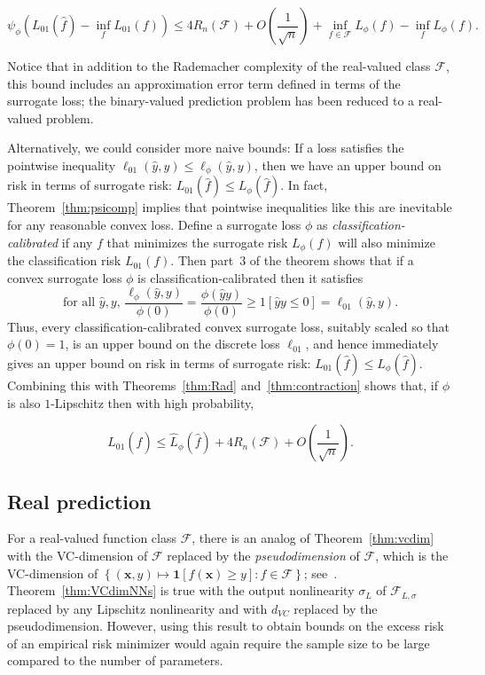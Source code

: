 \begin{equation}\label{eqn:phiriskbound}
  \psi_\phi\left(L_{01}(\widehat f)-\inf_fL_{01}(f)\right)
  \le 4R_n({\mathcal F}) + O\left(\frac{1}{\sqrt n}\right) +
  \inf_{f\in{\mathcal F}}L_{\phi}(f)-\inf_fL_{\phi}(f).
\end{equation}

Notice that in addition to the Rademacher complexity of the real-valued class ${\mathcal F}$, this bound includes an approximation error term defined in terms of the surrogate loss; the binary-valued prediction problem has been reduced to a real-valued problem.

Alternatively, we could consider more naive bounds: If a loss satisfies the pointwise inequality $\ell_{01}(\widehat
y,y)\le\ell_{\phi}(\widehat y,y)$, then we have an upper bound on risk in terms of surrogate risk: $L_{01}(\widehat f)\le L_{\phi}(\widehat f)$.  In fact,
Theorem~\ref{thm:psicomp} implies that pointwise inequalities like this are inevitable for any reasonable convex loss. Define a surrogate loss $\phi$ as {\em classification-calibrated} if any $f$ that minimizes the surrogate risk $L_\phi(f)$ will also minimize the classification risk $L_{01}(f)$.  Then part~3 of the theorem shows that if a convex surrogate loss $\phi$ is classification-calibrated then it satisfies
  \[
    \text{for all $\widehat y, y$, } \frac{\ell_\phi(\widehat y,y)}{\phi(0)}
    = \frac{\phi(\widehat y y)}{\phi(0)}
    \ge 1[\widehat y y \le 0] = \ell_{01}(\widehat y,y).
  \]
Thus, every classification-calibrated convex surrogate loss, suitably scaled so that $\phi(0)=1$, is an upper bound on the discrete loss
$\ell_{01}$, and hence immediately gives an upper bound on risk in terms of surrogate risk: $L_{01}(\widehat f)\le L_{\phi}(\widehat f)$.  Combining this with Theorems~\ref{thm:Rad} and~\ref{thm:contraction} shows that, if $\phi$ is also $1$-Lipschitz then with high probability,

\begin{equation}\label{eqn:phiupper}
  L_{01}(\widehat f)\le \widehat L_{\phi}(\widehat f) + 4R_n({\mathcal F})
    + O\left(\frac{1}{\sqrt n}\right).
\end{equation}

\subsection{Real prediction}

For a real-valued function class ${\mathcal F}$, there is an analog of
Theorem~\ref{thm:vcdim} with the VC-dimension of ${\mathcal F}$ replaced by the
{\em pseudodimension} of ${\mathcal F}$, which is the VC-dimension of
$\left\{({\boldsymbol x},y)\mapsto \ensuremath{\boldsymbol{1}\left[f({\boldsymbol x})\ge y\right]}: f\in {\mathcal F}\right\}$;
see~\cite{p-epta-90}.  Theorem~\ref{thm:VCdimNNs} is true with the output nonlinearity $\sigma_L$ of ${\mathcal F}_{L,\sigma}$ replaced by any Lipschitz nonlinearity and with $d_{VC}$ replaced by the pseudodimension. However, using this result to obtain bounds on the excess risk of an empirical risk minimizer would again require the sample size to be large compared to the number of parameters.

